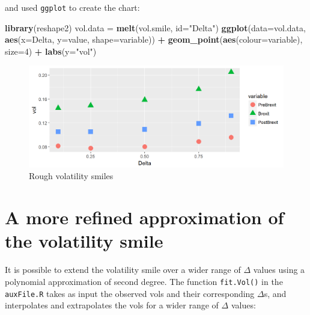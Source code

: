\documentclass[]{book}
\newenvironment{Shaded}{\begin{snugshade}}{\end{snugshade}}
\newcommand{\KeywordTok}[1]{\textcolor[rgb]{0.13,0.29,0.53}{\textbf{#1}}}
\newcommand{\DataTypeTok}[1]{\textcolor[rgb]{0.13,0.29,0.53}{#1}}
\newcommand{\DecValTok}[1]{\textcolor[rgb]{0.00,0.00,0.81}{#1}}
\newcommand{\StringTok}[1]{\textcolor[rgb]{0.31,0.60,0.02}{#1}}
\newcommand{\OperatorTok}[1]{\textcolor[rgb]{0.81,0.36,0.00}{\textbf{#1}}}
\newcommand{\NormalTok}[1]{#1}
\theoremstyle{definition}
\theoremstyle{definition}
\theoremstyle{definition}
\theoremstyle{remark}
\begin{document}
and used \texttt{ggplot} to create the chart:

\begin{Shaded}
\begin{Highlighting}[]
\KeywordTok{library}\NormalTok{(reshape2)}
\NormalTok{vol.data =}\StringTok{ }\KeywordTok{melt}\NormalTok{(vol.smile, }\DataTypeTok{id=}\StringTok{"Delta"}\NormalTok{)}
\KeywordTok{ggplot}\NormalTok{(}\DataTypeTok{data=}\NormalTok{vol.data, }\KeywordTok{aes}\NormalTok{(}\DataTypeTok{x=}\NormalTok{Delta, }\DataTypeTok{y=}\NormalTok{value, }\DataTypeTok{shape=}\NormalTok{variable)) }\OperatorTok{+}
\StringTok{   }\KeywordTok{geom_point}\NormalTok{(}\KeywordTok{aes}\NormalTok{(}\DataTypeTok{colour=}\NormalTok{variable), }\DataTypeTok{size=}\DecValTok{4}\NormalTok{) }\OperatorTok{+}
\StringTok{   }\KeywordTok{labs}\NormalTok{(}\DataTypeTok{y=}\StringTok{"vol"}\NormalTok{)}
\end{Highlighting}
\end{Shaded}

\begin{figure}
\includegraphics[width=1\linewidth]{images/unnamed-chunk-34-1} \caption{Rough volatility smiles}\label{fig:unnamed-chunk-34}
\end{figure}

\section{A more refined approximation of the volatility
smile}\label{a-more-refined-approximation-of-the-volatility-smile}

It is possible to extend the volatility smile over a wider range of
\(\Delta\) values using a polynomial approximation of second degree. The
function \texttt{fit.Vol()} in the \texttt{auxFile.R} takes as input the
observed vols and their corresponding \(\Delta\)s, and interpolates and
extrapolates the vols for a wider range of \(\Delta\) values:
\end{document}
